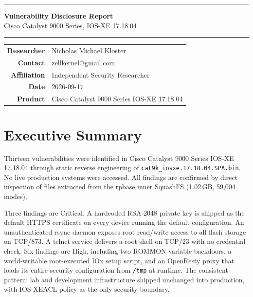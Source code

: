 \documentclass[11pt,a4paper]{article}
\begin{document}

\thispagestyle{empty}
\vspace*{0.20\textheight}

\noindent\rule{\linewidth}{0.6pt}

\begin{center}
{\large\bfseries Vulnerability Disclosure Report}\\[0.3em]
{\small Cisco Catalyst 9000 Series, IOS-XE 17.18.04}
\end{center}

\noindent\rule{\linewidth}{0.6pt}

\vspace{0.10\textheight}

\noindent
\begin{tabular}{r @{\quad} l}
\textbf{Researcher}  & Nicholas Michael Kloster \\
\textbf{Contact}     & zellkernel@gmail.com \\
\textbf{Affiliation} & Independent Security Researcher \\
\textbf{Date}        & 2026-09-17 \\
\textbf{Product}     & Cisco Catalyst 9000 Series IOS-XE 17.18.04 \\
\end{tabular}

\newpage

\thispagestyle{plain}
\tableofcontents

\newpage

\section{Executive Summary}

Thirteen vulnerabilities were identified in Cisco Catalyst 9000 Series IOS-XE 17.18.04
through static reverse engineering of \texttt{cat9k\_iosxe.17.18.04.SPA.bin}. No live
production systems were accessed. All findings are confirmed by direct inspection of
files extracted from the rpbase inner SquashFS (1.02\,GB, 59,004 inodes).

Three findings are Critical. A hardcoded RSA-2048 private key is shipped as the default
HTTPS certificate on every device running the default configuration. An unauthenticated
rsync daemon exposes root read/write access to all flash storage on TCP/873. A telnet
service delivers a root shell on TCP/23 with no credential check. Six findings are High,
including two ROMMON variable backdoors, a world-writable root-executed IOx setup script,
and an OpenResty proxy that loads its entire security configuration from \texttt{/tmp}
at runtime. The consistent pattern: lab and development infrastructure shipped unchanged
into production, with IOS-XE\@ ACL policy as the only security boundary.
\end{document}
